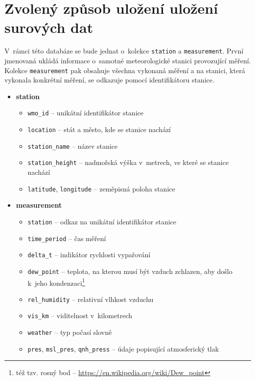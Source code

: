 \documentclass[10pt,a4paper,titlepage]{extarticle}
\begin{document}
    \section{Zvolený způsob uložení uložení surových dat}\label{sec:zvoleny-zpusob-ulozeni-surovych-dat}
    V~rámci této databáze se bude jednat o~kolekce \texttt{station} a \texttt{measurement}. První jmenovaná ukládá
    informace o~samotné meteorologické stanici provozující měření.
    Kolekce \texttt{measurement} pak obsahuje všechna vykonaná měření a na stanici,
    která vykonala konkrétní měření, se odkazuje pomocí identifikátoru stanice.
    \begin{itemize}
        \item \textbf{station}
        \begin{itemize}[label=\textperiodcentered]
            \item \texttt{wmo\_id} -- unikátní identifikátor stanice
            \item \texttt{location} -- stát a město, kde se stanice nachází
            \item \texttt{station\_name} -- název stanice
            \item \texttt{station\_height} -- nadmořská výška v~metrech, ve které se stanice nachází
            \item \texttt{latitude}, \texttt{longitude} -- zeměpisná poloha stanice
        \end{itemize}
        \item \textbf{measurement}
        \begin{itemize}[label=\textperiodcentered]
            \item \texttt{station} -- odkaz na unikátní identifikátor stanice
            \item \texttt{time\_period} -- čas měření
            \item \texttt{delta\_t} -- indikátor rychlosti vypařování
            \item \texttt{dew\_point} -- teplota, na kterou musí být vzduch zchlazen, aby došlo k~jeho
            kondenzaci\footnote{též tzv. rosný bod -- \url{https://en.wikipedia.org/wiki/Dew\_point}}
            \item \texttt{rel\_humidity} -- relativní vlhkost vzduchu
            \item \texttt{vis\_km} -- viditelnost v~kilometrech
            \item \texttt{weather} -- typ počasí slovně
            \item \texttt{pres}, \texttt{msl\_pres}, \texttt{qnh\_press} -- údaje popisující atmosferický tlak

\end{itemize}
\end{itemize}
\end{document}
